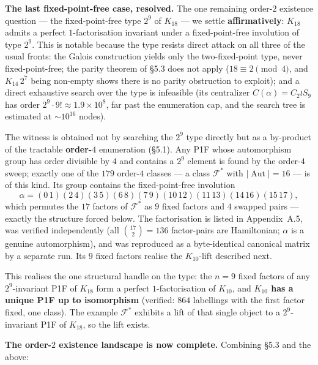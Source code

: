 \documentclass[11pt,reqno]{amsart}
\theoremstyle{plain}
\theoremstyle{definition}
\numberwithin{theorem}{section}
\newcommand{\Aut}{\operatorname{Aut}}
\begin{document}
\medskip
\noindent\textbf{The last fixed-point-free case, resolved.} The one remaining order-$2$ existence
question --- the fixed-point-free type $2^9$ of $K_{18}$ --- we settle \textbf{affirmatively}:
$K_{18}$ admits a perfect $1$-factorisation invariant under a fixed-point-free involution
of type $2^9$. This is notable because the type resists direct attack on all three of the
usual fronts: the Galois construction yields only the two-fixed-point type, never
fixed-point-free; the parity theorem of \S5.3 does not apply ($18\equiv2\pmod4$, and
$K_{14}\,2^7$ being non-empty shows there is no parity obstruction to exploit); and a
direct exhaustive search over the type is infeasible (its centralizer
$C(\alpha)=C_2\wr S_9$ has order $2^9\cdot 9!\approx 1.9\times10^8$, far past the
enumeration cap, and the search tree is estimated at $\sim 10^{16}$ nodes).

The witness is obtained not by searching the $2^9$ type directly but as a by-product of
the tractable \textbf{order-$4$} enumeration (\S5.1). Any P1F whose automorphism group has order
divisible by $4$ and contains a $2^9$ element is found by the order-$4$ sweep; exactly one
of the $179$ order-$4$ classes --- a class $\mathcal F^\ast$ with $|\Aut|=16$ --- is of
this kind. Its group contains the fixed-point-free involution
\[
\alpha=(0\,1)(2\,4)(3\,5)(6\,8)(7\,9)(10\,12)(11\,13)(14\,16)(15\,17),
\]
which permutes the $17$ factors of $\mathcal F^\ast$ as $9$ fixed factors and $4$ swapped
pairs --- exactly the structure forced below. The factorisation is listed in Appendix~A.5,
was verified independently (all $\binom{17}{2}=136$ factor-pairs are Hamiltonian; $\alpha$
is a genuine automorphism), and was reproduced as a byte-identical canonical matrix by a
separate run. Its $9$ fixed factors realise the $K_{10}$-lift described next.

This realises the one structural handle on the type: the $n=9$ fixed factors of any
$2^9$-invariant P1F of $K_{18}$ form a perfect $1$-factorisation of $K_{10}$, and
\textbf{$K_{10}$ has a unique P1F up to isomorphism} (verified: $864$ labellings with the first
factor fixed, one class). The example $\mathcal F^\ast$ exhibits a lift of that single
object to a $2^9$-invariant P1F of $K_{18}$, so the lift exists.

\medskip
\noindent\textbf{The order-$2$ existence landscape is now complete.} Combining \S5.3 and the above:
\end{document}
